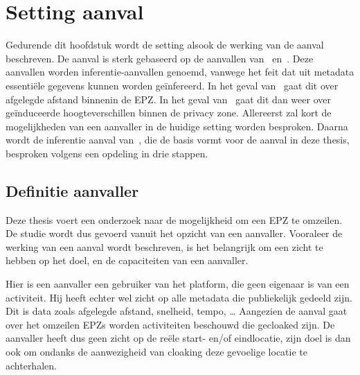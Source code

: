 
\chapter{Setting aanval}\label{sec:inferentieaanval}
Gedurende dit hoofdstuk wordt de setting alsook de werking van de aanval
beschreven. De aanval is sterk gebaseerd op de aanvallen
van~\citeauthor{Dhondt_Pochat_Voulimeneas_Joosen_Volckaert_2022}\cite{Dhondt_Pochat_Voulimeneas_Joosen_Volckaert_2022}
en~\citeauthor{Verdonck_2022}\cite{Verdonck_2022}. Deze aanvallen worden
inferentie-aanvallen genoemd, vanwege het feit dat uit metadata essentiële
gegevens kunnen worden geïnfereerd. In het geval
van~\citeauthor{Dhondt_Pochat_Voulimeneas_Joosen_Volckaert_2022} gaat dit over
afgelegde afstand binnenin de \ac{EPZ}. In het geval
van~\citeauthor{Verdonck_2022} gaat dit dan weer over geïnduceerde
hoogteverschillen binnen de privacy zone. Allereerst zal kort de mogelijkheden
van een aanvaller in de huidige setting worden besproken. Daarna wordt de
inferentie aanval
van~\citeauthor{Dhondt_Pochat_Voulimeneas_Joosen_Volckaert_2022}, die de basis
vormt voor de aanval in deze thesis, besproken volgens een opdeling in drie
stappen.

\section{Definitie aanvaller}
Deze thesis voert een onderzoek naar de mogelijkheid om een \ac{EPZ} te
omzeilen. De studie wordt dus gevoerd vanuit het opzicht van een aanvaller.
Vooraleer de werking van een aanval wordt beschreven, is het belangrijk om een
zicht te hebben op het doel, en de capaciteiten van een aanvaller.

Hier is een aanvaller een gebruiker van het platform, die geen eigenaar is van
een activiteit. Hij heeft echter wel zicht op alle metadata die publiekelijk
gedeeld zijn. Dit is data zoals afgelegde afstand, snelheid, tempo, \ldots
Aangezien de aanval gaat over het omzeilen \acp{EPZ} worden activiteiten
beschouwd die gecloaked zijn. De aanvaller heeft dus geen zicht op de reële
start- en/of eindlocatie, zijn doel is dan ook om ondanks de aanwezigheid van
cloaking deze gevoelige locatie te achterhalen.

